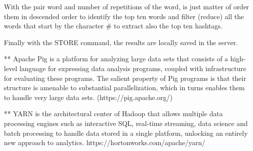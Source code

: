 \documentclass{article}
\begin{document}
        With the pair word and number of repetitions of the word, is just matter of order them in descended order to identify the top ten words and filter (reduce) all the words that start by the character \# to 
        extract also the top ten hashtags.

        Finally with the STORE command, the results are locally saved in the server.

        ** Apache Pig is a platform for analyzing large data sets that consists of a high-level language for expressing data analysis programs, coupled with infrastructure for evaluating these programs. 
        The salient property of Pig programs is that their structure is amenable to substantial parallelization, which in turns enables them to handle very large data sets. 
        (https://pig.apache.org/)

        ** YARN is the architectural center of Hadoop that allows multiple data processing engines such as interactive SQL, real-time streaming, data science and batch processing to handle data stored 
        in a single platform, unlocking an entirely new approach to analytics.
        https://hortonworks.com/apache/yarn/
		\pagebreak          
\end{document}
